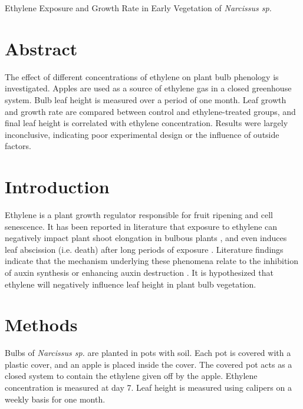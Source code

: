\documentclass{report}
\begin{document}
\begin{center}
  \Large
  Ethylene Exposure and Growth Rate in Early Vegetation of \textit{Narcissus sp.}
\end{center}

\vspace{0.5cm}

\begin{multicols}{3}

  \section*{Abstract}
  The effect of different concentrations of ethylene on plant bulb phenology is investigated.
  Apples are used as a source of ethylene gas in a closed greenhouse system.
  Bulb leaf height is measured over a period of one month.
  Leaf growth and growth rate are compared between control and ethylene-treated groups, and final leaf height is correlated with ethylene concentration.
  Results were largely inconclusive, indicating poor experimental design or the influence of outside factors.
  \section*{Introduction}
  Ethylene is a plant growth regulator responsible for fruit ripening and cell senescence.
  It has been reported in literature that exposure to ethylene can negatively impact plant shoot elongation in bulbous plants \parencite{bulbous}, and even induces leaf abscission (i.e. death) after long periods of exposure \parencite{abscission}.
  Literature findings indicate that the mechanism underlying these phenomena relate to the inhibition of auxin synthesis or enhancing auxin destruction \parencite{senescence}.
  It is hypothesized that ethylene will negatively influence leaf height in plant bulb vegetation.
  \vfill\null
  \columnbreak
  \section*{Methods}
  Bulbs of \textit{Narcissus sp.} are planted in pots with soil.
  Each pot is covered with a plastic cover, and an apple is placed inside the cover.
  The covered pot acts as a closed system to contain the ethylene given off by the apple.
  Ethylene concentration is measured at day 7.
  Leaf height is measured using calipers on a weekly basis for one month.

\end{multicols}
\end{document}
